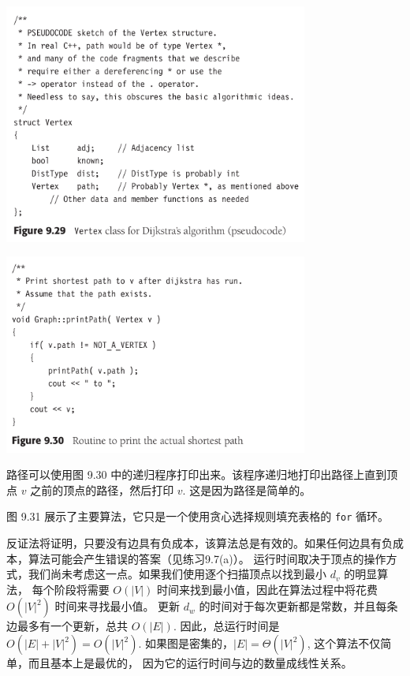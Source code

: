 \documentclass[a4paper]{ctexart}
\theoremstyle{definition}
\theoremstyle{definition}
\begin{document}
\begin{center}
  \includegraphics[width=0.75\textwidth]{images/FIG9_29.png}
\end{center}

\begin{center}
  \includegraphics[width=0.75\textwidth]{images/FIG9_30.png}
\end{center}

路径可以使用图 9.30 中的递归程序打印出来。该程序递归地打印出路径上直到顶点 \( v \) 之前的顶点的路径，然后打印 \( v \). 这是因为路径是简单的。

图 9.31 展示了主要算法，它只是一个使用贪心选择规则填充表格的 \verb|for| 循环。

反证法将证明，只要没有边具有负成本，该算法总是有效的。如果任何边具有负成本，算法可能会产生错误的答案（见练习9.7(a)）。
运行时间取决于顶点的操作方式，我们尚未考虑这一点。如果我们使用逐个扫描顶点以找到最小 \( d_v \) 的明显算法，
每个阶段将需要 \( O(|V|) \) 时间来找到最小值，因此在算法过程中将花费 \( O(|V|^2) \) 时间来寻找最小值。
更新 \( d_w \) 的时间对于每次更新都是常数，并且每条边最多有一个更新，总共 \( O(|E|) \). 
因此，总运行时间是 \( O(|E| + |V|^2) = O(|V|^2) \). 如果图是密集的，\( |E| = \Theta(|V|^2) \), 这个算法不仅简单，而且基本上是最优的，
因为它的运行时间与边的数量成线性关系。
\end{document}
